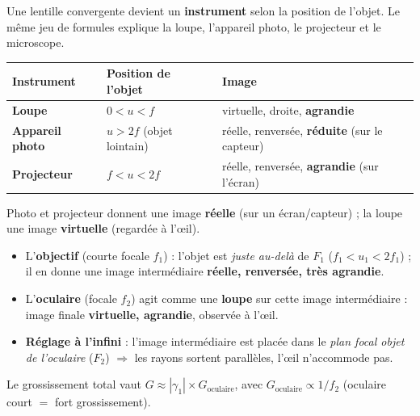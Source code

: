 \documentclass[11pt,a4paper]{article}
\begin{document}

Une lentille convergente devient un \textbf{instrument} selon la position de l'objet. Le même jeu de
formules explique la loupe, l'appareil photo, le projecteur et le microscope.

\begin{cle}
\begin{center}\small
\renewcommand{\arraystretch}{1.25}
\begin{tabular}{>{\bfseries}l l l}
\toprule
Instrument & Position de l'objet & Image \\
\midrule
\rowcolor{excol!8} Loupe & $0<u<f$ & virtuelle, droite, \textbf{agrandie} \\
Appareil photo & $u>2f$ (objet lointain) & réelle, renversée, \textbf{réduite} (sur le capteur) \\
\rowcolor{defcol!8} Projecteur & $f<u<2f$ & réelle, renversée, \textbf{agrandie} (sur l'écran) \\
\bottomrule
\end{tabular}
\end{center}
Photo et projecteur donnent une image \textbf{réelle} (sur un écran/capteur) ; la loupe une image
\textbf{virtuelle} (regardée à l'\oe il).
\end{cle}

\begin{cle}
\begin{itemize}[leftmargin=1.5em,topsep=2pt,itemsep=1pt]
  \item L'\textbf{objectif} (courte focale $f_1$) : l'objet est \emph{juste au-delà} de $F_1$
        ($f_1<u_1<2f_1$) ; il en donne une image intermédiaire \textbf{réelle, renversée, très
        agrandie}.
  \item L'\textbf{oculaire} (focale $f_2$) agit comme une \textbf{loupe} sur cette image
        intermédiaire : image finale \textbf{virtuelle, agrandie}, observée à l'\oe il.
  \item \textbf{Réglage à l'infini} : l'image intermédiaire est placée dans le \emph{plan focal objet
        de l'oculaire} ($F_2$) $\Rightarrow$ les rayons sortent parallèles, l'\oe il n'accommode pas.
\end{itemize}
Le grossissement total vaut $G\approx |\gamma_1|\times G_{\text{oculaire}}$, avec
$G_{\text{oculaire}}\propto 1/f_2$ (oculaire court $=$ fort grossissement).
\end{cle}
\end{document}
